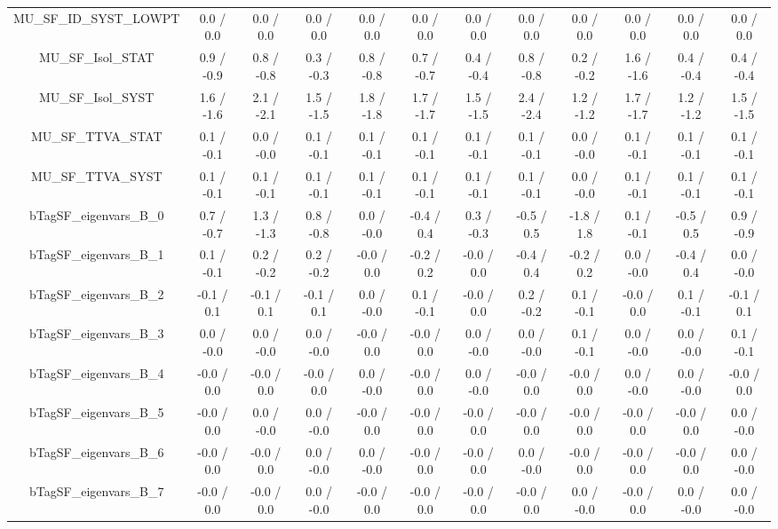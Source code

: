 \begin{table}[htbp]
\begin{center}
\begin{tabular}{|c|c|c|c|c|c|c|c|c|c|c|c|}
  MU_SF_ID_SYST_LOWPT & 0.0 / 0.0 & 0.0 / 0.0 & 0.0 / 0.0 & 0.0 / 0.0 & 0.0 / 0.0 & 0.0 / 0.0 & 0.0 / 0.0 & 0.0 / 0.0 & 0.0 / 0.0 & 0.0 / 0.0 & 0.0 / 0.0 \\ 
  MU_SF_Isol_STAT & 0.9 / -0.9 & 0.8 / -0.8 & 0.3 / -0.3 & 0.8 / -0.8 & 0.7 / -0.7 & 0.4 / -0.4 & 0.8 / -0.8 & 0.2 / -0.2 & 1.6 / -1.6 & 0.4 / -0.4 & 0.4 / -0.4 \\ 
  MU_SF_Isol_SYST & 1.6 / -1.6 & 2.1 / -2.1 & 1.5 / -1.5 & 1.8 / -1.8 & 1.7 / -1.7 & 1.5 / -1.5 & 2.4 / -2.4 & 1.2 / -1.2 & 1.7 / -1.7 & 1.2 / -1.2 & 1.5 / -1.5 \\ 
  MU_SF_TTVA_STAT & 0.1 / -0.1 & 0.0 / -0.0 & 0.1 / -0.1 & 0.1 / -0.1 & 0.1 / -0.1 & 0.1 / -0.1 & 0.1 / -0.1 & 0.0 / -0.0 & 0.1 / -0.1 & 0.1 / -0.1 & 0.1 / -0.1 \\ 
  MU_SF_TTVA_SYST & 0.1 / -0.1 & 0.1 / -0.1 & 0.1 / -0.1 & 0.1 / -0.1 & 0.1 / -0.1 & 0.1 / -0.1 & 0.1 / -0.1 & 0.0 / -0.0 & 0.1 / -0.1 & 0.1 / -0.1 & 0.1 / -0.1 \\ 
  bTagSF_eigenvars_B_0 & 0.7 / -0.7 & 1.3 / -1.3 & 0.8 / -0.8 & 0.0 / -0.0 & -0.4 / 0.4 & 0.3 / -0.3 & -0.5 / 0.5 & -1.8 / 1.8 & 0.1 / -0.1 & -0.5 / 0.5 & 0.9 / -0.9 \\ 
  bTagSF_eigenvars_B_1 & 0.1 / -0.1 & 0.2 / -0.2 & 0.2 / -0.2 & -0.0 / 0.0 & -0.2 / 0.2 & -0.0 / 0.0 & -0.4 / 0.4 & -0.2 / 0.2 & 0.0 / -0.0 & -0.4 / 0.4 & 0.0 / -0.0 \\ 
  bTagSF_eigenvars_B_2 & -0.1 / 0.1 & -0.1 / 0.1 & -0.1 / 0.1 & 0.0 / -0.0 & 0.1 / -0.1 & -0.0 / 0.0 & 0.2 / -0.2 & 0.1 / -0.1 & -0.0 / 0.0 & 0.1 / -0.1 & -0.1 / 0.1 \\ 
  bTagSF_eigenvars_B_3 & 0.0 / -0.0 & 0.0 / -0.0 & 0.0 / -0.0 & -0.0 / 0.0 & -0.0 / 0.0 & 0.0 / -0.0 & 0.0 / -0.0 & 0.1 / -0.1 & 0.0 / -0.0 & 0.0 / -0.0 & 0.1 / -0.1 \\ 
  bTagSF_eigenvars_B_4 & -0.0 / 0.0 & -0.0 / 0.0 & -0.0 / 0.0 & 0.0 / -0.0 & -0.0 / 0.0 & 0.0 / -0.0 & -0.0 / 0.0 & -0.0 / 0.0 & 0.0 / -0.0 & 0.0 / -0.0 & -0.0 / 0.0 \\ 
  bTagSF_eigenvars_B_5 & -0.0 / 0.0 & 0.0 / -0.0 & 0.0 / -0.0 & -0.0 / 0.0 & -0.0 / 0.0 & -0.0 / 0.0 & -0.0 / 0.0 & -0.0 / 0.0 & -0.0 / 0.0 & -0.0 / 0.0 & 0.0 / -0.0 \\ 
  bTagSF_eigenvars_B_6 & -0.0 / 0.0 & -0.0 / 0.0 & 0.0 / -0.0 & 0.0 / -0.0 & -0.0 / 0.0 & -0.0 / 0.0 & 0.0 / -0.0 & -0.0 / 0.0 & -0.0 / 0.0 & -0.0 / 0.0 & 0.0 / -0.0 \\ 
  bTagSF_eigenvars_B_7 & -0.0 / 0.0 & -0.0 / 0.0 & 0.0 / -0.0 & -0.0 / 0.0 & -0.0 / 0.0 & -0.0 / 0.0 & -0.0 / 0.0 & 0.0 / -0.0 & -0.0 / 0.0 & 0.0 / -0.0 & 0.0 / -0.0 \\ 

\end{tabular}
\end{center}
\end{table}
